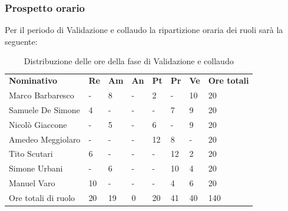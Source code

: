     \subsubsection{Prospetto orario}
    Per il periodo di Validazione e collaudo la ripartizione oraria dei ruoli sarà la seguente:
        \begin{center}
            \begin{table}[ht!]
                \centering
                \caption{Distribuzione delle ore della fase di Validazione e collaudo}
                \vspace{5px}
                \renewcommand{\arraystretch}{1.8}
                \begin{tabular}{p{100px} p{20px} p{20px} p{20px} p{20px} p{20px} p{20px} p{50px} }
                    \rowcolor{logo!70} \textbf{Nominativo} & \textbf{Re} & \textbf{Am} & \textbf{An} & \textbf{Pt} & \textbf{Pr} & \textbf{Ve} & \textbf{Ore totali}\\
                    Marco Barbaresco & - & 8 & - & 2 & - & 10 & 20\\
                    Samuele De Simone & 4 & - & - & - & 7 & 9 & 20\\
                    Nicolò Giaccone & - & 5 & - & 6 & - & 9 & 20\\
                    Amedeo Meggiolaro & - & - & - & 12 & 8 & - & 20\\
                    Tito Scutari & 6 & - & - & - & 12 & 2 & 20\\
                    Simone Urbani & - & 6 & - & - & 10 & 4 & 20\\
                    Manuel Varo & 10 & - & - & - & 4 & 6 & 20\\
                    Ore totali di ruolo & 20 & 19 & 0 & 20 & 41 & 40 & 140\\
                \end{tabular}
            \end{table}
        \end{center}
        \pagebreak

